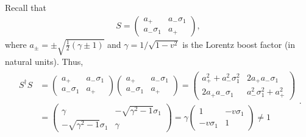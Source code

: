 Recall that 
\begin{eqnarray}
    \label{eq:S-mat}
    S = \begin{pmatrix}
        a_{+} & a_{-}\sigma_1 \\
        a_{-}\sigma_1 & a_{+}
    \end{pmatrix}   
,\end{eqnarray}
where $a_{\pm} = \pm \sqrt{\frac{1}{2}(\gamma \pm 1)}$ and $\gamma = 1/\sqrt{1 - v^2}$ is the Lorentz boost factor (in natural units).
Thus,
\begin{eqnarray}
    \label{eq:SdaggerS}
    \begin{aligned}    
        S^{\dagger} S &= \begin{pmatrix}
        a_{+} & a_{-} \sigma_1 \\
        a_{-} \sigma_1 & a_{+}
    \end{pmatrix}
    \begin{pmatrix}
        a_{+} & a_{-} \sigma_1 \\
        a_{-} \sigma_1 & a_{+}
    \end{pmatrix}
    = 
    \begin{pmatrix}
        a_{+}^2 + a_{-}^2 \sigma_1^2 & 2 a_{+}a_{-} \sigma_1 \\
        2 a_{+}a_{-} \sigma_1 & a_{-}^2 \sigma_1^2 + a_{+}^2
    \end{pmatrix} 
    \\
                      &=
    \begin{pmatrix}
        \gamma & -\sqrt{\gamma^2 - 1} \sigma_1 \\
        -\sqrt{\gamma^2 - 1}\sigma_1 & \gamma
    \end{pmatrix}
    =
    \gamma
    \begin{pmatrix}
        1 & -v \sigma_1 \\
        -v \sigma_1 & 1
    \end{pmatrix} 
    \ne 1
    \end{aligned}
.\end{eqnarray}


